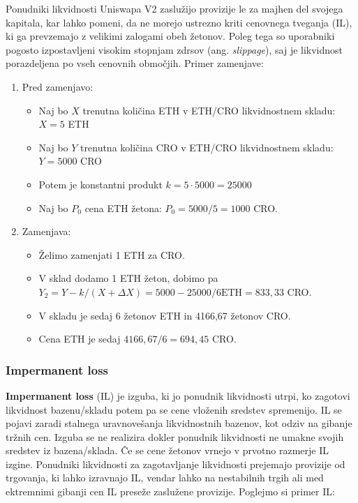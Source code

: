 \documentclass[a4paper,12pt]{article}%
\begin{document}
Ponudniki likvidnosti Uniswapa V2 zaslužijo provizije le za majhen del svojega kapitala, kar lahko pomeni, da ne morejo ustrezno kriti cenovnega tveganja (IL), ki ga prevzemajo z velikimi zalogami obeh žetonov. Poleg tega so uporabniki pogosto izpostavljeni visokim stopnjam zdrsov (ang. \textit{slippage}), saj je likvidnost porazdeljena po vseh cenovnih območjih. 
\newline
Primer zamenjave:
\begin{enumerate}
    \item Pred zamenjavo:
    \begin{itemize}
        \item Naj bo $X$ trenutna količina ETH v ETH/CRO likvidnostnem skladu: $X = 5$ ETH
        \item Naj bo $Y$ trenutna količina CRO v ETH/CRO likvidnostnem skladu: $Y = 5000$ CRO 
        \item Potem je konstantni produkt $k = 5 \cdot 5000 = 25000$
        \item Naj bo $P_0$ cena ETH žetona: $P_0 = 5000/5 = 1000$ CRO. 
    \end{itemize}
    \item Zamenjava: 
    \begin{itemize}
        \item Želimo zamenjati 1 ETH za CRO.
        \item V sklad dodamo 1 ETH žeton, dobimo pa $Y_2 = Y - k/(X+\Delta X) = 5000 - 25000/{6 \text{ETH}} = 833,33$ CRO.
        \item V skladu je sedaj 6 žetonov ETH in 4166,67 žetonov CRO.
        \item Cena ETH je sedaj $4166,67/6 = 694,45$ CRO.
    \end{itemize}
\end{enumerate}

\subsubsection{Impermanent loss}
\textbf{Impermanent loss} (IL) je izguba, ki jo ponudnik likvidnosti utrpi, ko zagotovi likvidnost bazenu/skladu potem pa se cene vloženih sredstev spremenijo. IL se pojavi zaradi stalnega uravnovešanja likvidnostnih bazenov, kot odziv na gibanje tržnih cen. Izguba se ne realizira dokler ponudnik likvidnosti ne umakne svojih sredstev iz bazena/sklada. Če se cene žetonov vrnejo v prvotno razmerje IL izgine. Ponudniki likvidnosti za zagotavljanje likvidnosti prejemajo provizije od trgovanja, ki lahko izravnajo IL, vendar lahko na nestabilnih trgih ali med ektremnimi gibanji cen IL preseže zaslužene provizije. 
\newline
Poglejmo si primer IL:
\end{document}
